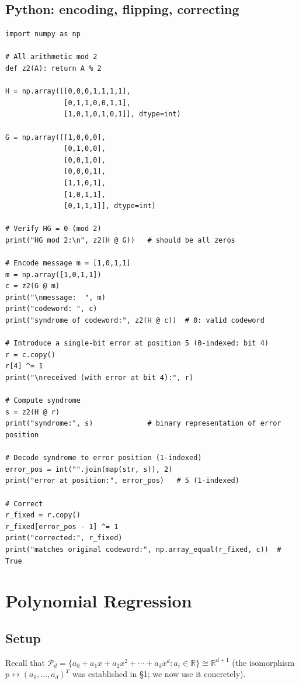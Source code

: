 \documentclass[11pt]{article}
\theoremstyle{definition}
\theoremstyle{plain}
\begin{document}
\subsection{Python: encoding, flipping, correcting}
\begin{lstlisting}
import numpy as np

# All arithmetic mod 2
def z2(A): return A % 2

H = np.array([[0,0,0,1,1,1,1],
              [0,1,1,0,0,1,1],
              [1,0,1,0,1,0,1]], dtype=int)

G = np.array([[1,0,0,0],
              [0,1,0,0],
              [0,0,1,0],
              [0,0,0,1],
              [1,1,0,1],
              [1,0,1,1],
              [0,1,1,1]], dtype=int)

# Verify HG = 0 (mod 2)
print("HG mod 2:\n", z2(H @ G))   # should be all zeros

# Encode message m = [1,0,1,1]
m = np.array([1,0,1,1])
c = z2(G @ m)
print("\nmessage:  ", m)
print("codeword: ", c)
print("syndrome of codeword:", z2(H @ c))  # 0: valid codeword

# Introduce a single-bit error at position 5 (0-indexed: bit 4)
r = c.copy()
r[4] ^= 1
print("\nreceived (with error at bit 4):", r)

# Compute syndrome
s = z2(H @ r)
print("syndrome:", s)             # binary representation of error position

# Decode syndrome to error position (1-indexed)
error_pos = int("".join(map(str, s)), 2)
print("error at position:", error_pos)   # 5 (1-indexed)

# Correct
r_fixed = r.copy()
r_fixed[error_pos - 1] ^= 1
print("corrected:", r_fixed)
print("matches original codeword:", np.array_equal(r_fixed, c))  # True
\end{lstlisting}

\section{Polynomial Regression}

\subsection{Setup}

Recall that $\mathcal{P}_d = \{a_0 + a_1 x + a_2 x^2 + \cdots + a_d x^d : a_i \in \mathbb{R}\}
\cong \mathbb{R}^{d+1}$ (the isomorphism $p \leftrightarrow (a_0,\ldots,a_d)^T$
was established in \S1; we now use it concretely).
\end{document}
